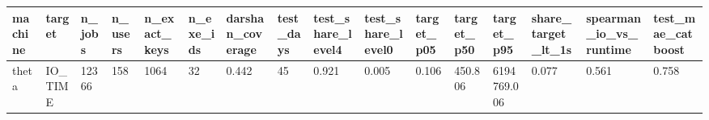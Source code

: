 \begin{tabular}{llllllllllllllll}
\toprule
machine & target & n_jobs & n_users & n_exact_keys & n_exe_ids & darshan_coverage & test_days & test_share_level4 & test_share_level0 & target_p05 & target_p50 & target_p95 & share_target_lt_1s & spearman_io_vs_runtime & test_mae_catboost \\
\midrule
theta & IO_TIME & 12366 & 158 & 1064 & 32 & 0.442 & 45 & 0.921 & 0.005 & 0.106 & 450.806 & 6194769.006 & 0.077 & 0.561 & 0.758 \\
\bottomrule
\end{tabular}
